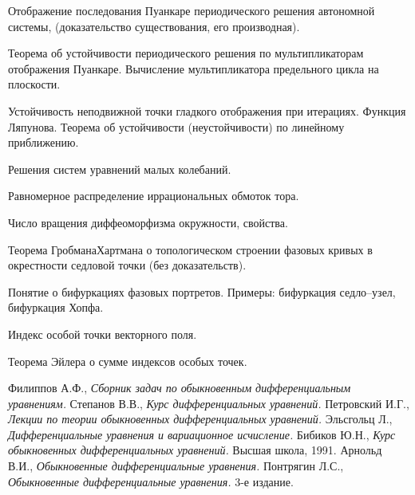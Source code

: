 \documentclass[a4paper]{article}
\begin{document}
\begin{nums}{-2}
\item
Отображение последования Пуанкаре периодического решения
автономной системы, (доказательство существования, его
производная).
\item
Теорема об устойчивости периодического решения по мультипликаторам
отображения Пуанкаре. Вычисление мультипликатора предельного цикла
на плоскости.
\item
Устойчивость неподвижной точки гладкого отображения при итерациях.
Функция Ляпунова. Теорема об устойчивости (неустойчивости) по
линейному приближению.
\item
Решения систем уравнений малых колебаний.
\item
Равномерное распределение иррациональных обмоток тора.
\item
Число вращения диффеоморфизма окружности, свойства.
\item
Теорема Гробмана\ч Хартмана о топологическом строении фазовых кривых
в окрестности седловой точки (без доказательств).
\item
Понятие о бифуркациях фазовых портретов. Примеры: бифуркация
седло--узел, бифуркация Хопфа.
\item
Индекс особой точки векторного поля.
\item
Теорема Эйлера о сумме индексов особых точек.
\end{nums}

\begin{thebibliography}{Фил}
Филиппов А.Ф., {\it Сборник задач по обыкновенным дифференциальным уравнениям.}
Степанов В.В., {\it Курс дифференциальных уравнений.}
Петровский И.Г., {\it Лекции по теории обыкновенных дифференциальных уравнений.}
Эльсгольц Л., {\it Дифференциальные уравнения и вариационное исчисление.}
Бибиков Ю.Н., {\it Курс обыкновенных дифференциальных уравнений.} Высшая школа, 1991.
Арнольд В.И., {\it Обыкновенные дифференциальные уравнения.}
Понтрягин Л.С., {\it Обыкновенные дифференциальные уравнения.} 3-е издание.
\end{thebibliography}
\end{document}

